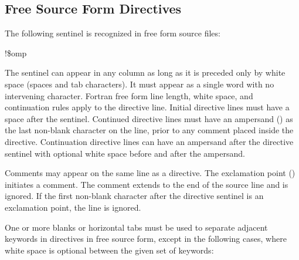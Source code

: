 \begin{alltt}
\end{alltt}
\noteend










\subsection{Free Source Form Directives}
\label{subsec:Free Source Form Directives}

The following sentinel is recognized in free form source files:

\begin{boxedcode}
!\$omp
\end{boxedcode}

The sentinel can appear in any column as long as it is preceded only by white space 
(spaces and tab characters). It must appear as a single word with no intervening 
character. Fortran free form line length, white space, and continuation rules apply to the 
directive line. Initial directive lines must have a space after the sentinel. Continued 
directive lines must have an ampersand (\code{\&}) as the last non-blank character on the line, 
prior to any comment placed inside the directive. Continuation directive lines can have 
an ampersand after the directive sentinel with optional white space before and after the 
ampersand.

Comments may appear on the same line as a directive. The exclamation point (\code{!}) 
initiates a comment. The comment extends to the end of the source line and is ignored. 
If the first non-blank character after the directive sentinel is an exclamation point, the 
line is ignored.

One or more blanks or horizontal tabs must be used to separate adjacent keywords in 
directives in free source form, except in the following cases, where white space is 
optional between the given set of keywords:

\begin{figure}[t!]
\end{figure}

